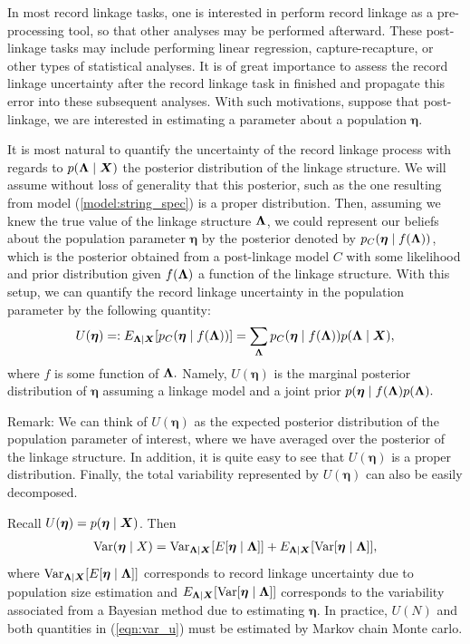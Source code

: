 \documentclass[11pt]{article}\usepackage[]{graphicx}\usepackage[]{color}
\newcommand{\Var}{\text{Var}}
\newcommand{\pop}{\boldsymbol{\eta}}
\begin{document}
In most record linkage tasks, one is interested in perform record linkage as a pre-processing tool, so that other analyses may be performed afterward. These post-linkage tasks may include performing linear regression, capture-recapture, or other types of statistical analyses. It is of great importance to assess the record linkage uncertainty after the record linkage task in finished and propagate this error into these subsequent analyses. With such motivations, suppose that post-linkage, we are interested in estimating a parameter about a population $\pop$.

It is most natural to quantify the uncertainty of the record linkage process with regards to $p(\boldsymbol{\Lambda} \mid \bm{X})$ the posterior distribution of the linkage structure. We will assume without loss of generality that this posterior, such as the one resulting from model (\ref{model:string_spec}) is a proper distribution. Then, assuming we knew the true value of the linkage structure $\boldsymbol{\Lambda}$, we could represent our beliefs about the population parameter $\pop$ by the posterior denoted by $p_C(\pop \mid f(\lam))$, which is the posterior obtained from a post-linkage model $C$ with some likelihood and prior distribution given $f(\boldsymbol{\Lambda})$ a function of the linkage structure. With this setup, we can quantify the record linkage uncertainty in the population parameter by the following quantity:
\begin{align}
\label{eqn:average-linkage}
U(\pop) =: E_{\lam \mid \bX} [p_C(\pop \mid f(\lam))] = \sum_{\lam} p_C(\pop\mid f(\lam)) p(\lam \mid \bX),
\end{align}
where $f$ is some function of $\boldsymbol{\Lambda}.$ Namely, $U(\pop)$ is the marginal posterior distribution of $\pop$ assuming a linkage model and a joint prior $p(\pop \mid f(\lam) p(\lam).$

Remark: We can think of $U(\pop)$ as the expected posterior distribution of the population parameter of interest, where we have averaged over the posterior of the linkage structure. In addition, it is quite easy to see that $U(\pop)$ is a proper distribution. Finally, the total variability represented by $U(\pop)$ can also be easily decomposed.

Recall $U(\pop) = p(\pop \mid \bX)$. Then
\begin{align}
\Var (\pop \mid X) = \Var_{\lam \mid \bX} [E[\pop \mid \lam ]] + E_{\lam \mid \bX} [\Var[\pop \mid \lam ]],
\label{eqn:var_u}
\end{align}
where $\Var_{\lam \mid \bX} [E[\pop \mid \lam ]]$ corresponds to record linkage uncertainty due to population size estimation and  $E_{\lam \mid \bX} [\Var[\pop \mid \lam ]]$ corresponds to the variability associated from a Bayesian method due to estimating $\pop$. In practice, $U(N)$ and both quantities in (\ref{eqn:var_u}) must be estimated by Markov chain Monte carlo.
\end{document}
